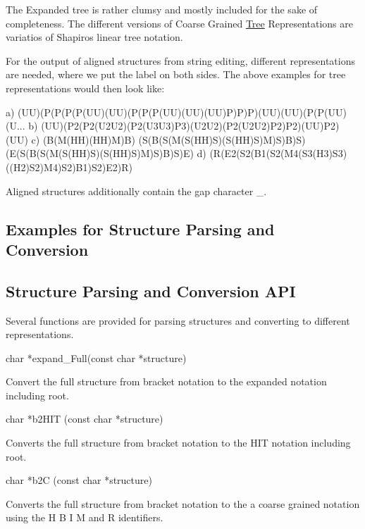 The Expanded tree is rather clumsy and mostly included for the sake of completeness. The different versions of Coarse Grained \mbox{\hyperlink{structTree}{Tree}} Representations are variatios of Shapiro\textquotesingle{}s linear tree notation.

For the output of aligned structures from string editing, different representations are needed, where we put the label on both sides. The above examples for tree representations would then look like\+:

\begin{DoxyVerb}a) (UU)(P(P(P(P(UU)(UU)(P(P(P(UU)(UU)(UU)P)P)P)(UU)(UU)(P(P(UU)(U...
b) (UU)(P2(P2(U2U2)(P2(U3U3)P3)(U2U2)(P2(U2U2)P2)P2)(UU)P2)(UU)
c) (B(M(HH)(HH)M)B)
   (S(B(S(M(S(HH)S)(S(HH)S)M)S)B)S)
   (E(S(B(S(M(S(HH)S)(S(HH)S)M)S)B)S)E)
d) (R(E2(S2(B1(S2(M4(S3(H3)S3)((H2)S2)M4)S2)B1)S2)E2)R)
\end{DoxyVerb}


Aligned structures additionally contain the gap character \textquotesingle{}\+\_\+\textquotesingle{}.\hypertarget{rna_structure_notations_structure_notations_examples}{}\subsection{Examples for Structure Parsing and Conversion}\label{rna_structure_notations_structure_notations_examples}
\hypertarget{rna_structure_notations_structure_notations_api}{}\subsection{Structure Parsing and Conversion A\+PI}\label{rna_structure_notations_structure_notations_api}
Several functions are provided for parsing structures and converting to different representations.

\begin{DoxyVerb}char  *expand_Full(const char *structure)
\end{DoxyVerb}
 Convert the full structure from bracket notation to the expanded notation including root.

\begin{DoxyVerb}char *b2HIT (const char *structure)
\end{DoxyVerb}
 Converts the full structure from bracket notation to the H\+IT notation including root.

\begin{DoxyVerb}char *b2C (const char *structure)
\end{DoxyVerb}
 Converts the full structure from bracket notation to the a coarse grained notation using the \textquotesingle{}H\textquotesingle{} \textquotesingle{}B\textquotesingle{} \textquotesingle{}I\textquotesingle{} \textquotesingle{}M\textquotesingle{} and \textquotesingle{}R\textquotesingle{} identifiers.

